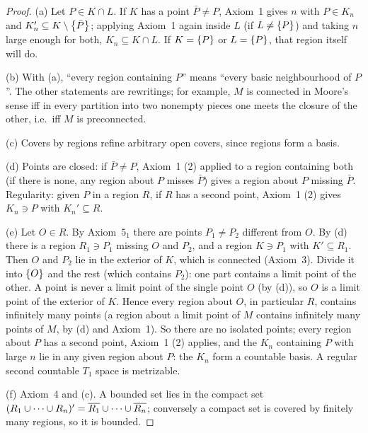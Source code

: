 \begin{proof}
(a) Let $P\in K\cap L$. If $K$ has a point $\bar P\ne P$, Axiom~1 gives $n$ with $P\in K_n$ and
$K_n'\subseteq K\setminus\left\{ \bar P \right\}$; applying Axiom~1 again inside $L$ (if $L\ne\left\{ P \right\}$) and taking $n$
large enough for both, $K_n\subseteq K\cap L$. If $K=\left\{ P \right\}$ or $L=\left\{ P \right\}$, that region itself will do.

(b) With (a), ``every region containing $P$'' means ``every basic neighbourhood of $P$''. The other
statements are rewritings; for example, $M$ is connected in Moore's sense iff in every partition into
two nonempty pieces one meets the closure of the other, i.e.\ iff $M$ is preconnected.

(c) Covers by regions refine arbitrary open covers, since regions form a basis.

(d) Points are closed: if $\bar P\ne P$, Axiom~1 (2) applied to a region containing both (if there is
none, any region about $P$ misses $\bar P$) gives a region about $P$ missing $\bar P$. Regularity:
given $P$ in a region $R$, if $R$ has a second point, Axiom~1 (2) gives $K_n\ni P$ with $K_n'\subseteq R$.

(e) Let $O\in R$. By Axiom~$5_1$ there are points $P_1\ne P_2$ different from $O$. By (d) there is a
region $R_1\ni P_1$ missing $O$ and $P_2$, and a region $K\ni P_1$ with $K'\subseteq R_1$. Then $O$ and $P_2$
lie in the exterior of $K$, which is connected (Axiom~3). Divide it into $\left\{ O \right\}$ and the rest (which
contains $P_2$): one part contains a limit point of the other. A point is never a limit point of the
single point $O$ (by (d)), so $O$ is a limit point of the exterior of $K$. Hence every region about $O$, in
particular $R$, contains infinitely many points (a region about a limit point of $M$ contains infinitely
many points of $M$, by (d) and Axiom~1). So there are no isolated points; every region about $P$ has a
second point, Axiom~1 (2) applies, and the $K_n$ containing $P$ with large $n$ lie in any given region
about $P$: the $K_n$ form a countable basis. A regular second countable $T_1$ space is metrizable.

(f) Axiom~4 and (c). A bounded set lies in the compact set $(R_1\cup\dots\cup R_n)'=\overline{R_1}\cup\dots\cup
\overline{R_n}$; conversely a compact set is covered by finitely many regions, so it is bounded.
\end{proof}


